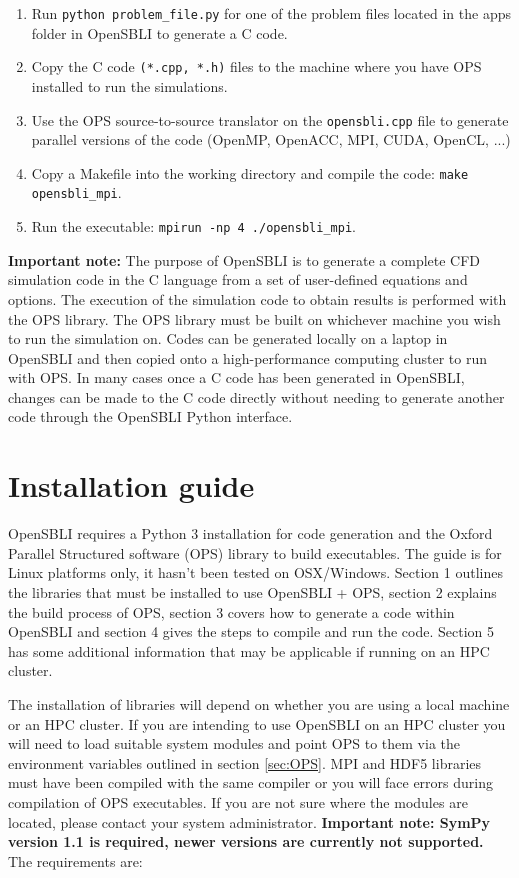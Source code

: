 \documentclass[11pt]{article}
\begin{document}
\begin{enumerate}
\item{Run \verb|python problem_file.py| for one of the problem files located in the apps folder in OpenSBLI to generate a C code.}
\item{Copy the C code \verb|(*.cpp, *.h)| files to the machine where you have OPS installed to run the simulations.}
\item{Use the OPS source-to-source translator on the \verb|opensbli.cpp| file to generate parallel versions of the code (OpenMP, OpenACC, MPI, CUDA, OpenCL, ...)}
\item{Copy a Makefile into the working directory and compile the code: \verb|make opensbli_mpi|.}
\item{Run the executable: \verb|mpirun -np 4 ./opensbli_mpi|.}
\end{enumerate}

\noindent\textbf{Important note:} The purpose of OpenSBLI is to generate a complete CFD simulation code in the C language from a set of user-defined equations and options. The execution of the simulation code to obtain results is performed with the OPS library. The OPS library must be built on whichever machine you wish to run the simulation on. Codes can be generated locally on a laptop in OpenSBLI and then copied onto a high-performance computing cluster to run with OPS. In many cases once a C code has been generated in OpenSBLI, changes can be made to the C code directly without needing to generate another code through the OpenSBLI Python interface.

\newpage
\tableofcontents

\newpage
\section{Installation guide}\label{sec:installation_guide}
OpenSBLI requires a Python 3 installation for code generation and the Oxford Parallel Structured software (OPS) library to build executables. The guide is for Linux platforms only, it hasn't been tested on OSX/Windows. Section 1 outlines the libraries that must be installed to use OpenSBLI + OPS, section 2 explains the build process of OPS, section 3 covers how to generate a code within OpenSBLI and section 4 gives the steps to compile and run the code. Section 5 has some additional information that may be applicable if running on an HPC cluster.


The installation of libraries will depend on whether you are using a local machine or an HPC cluster. If you are intending to use OpenSBLI on an HPC cluster you will need to load suitable system modules and point OPS to them via the environment variables outlined in section \ref{sec:OPS}. MPI and HDF5 libraries must have been compiled with the same compiler or you will face errors during compilation of OPS executables. If you are not sure where the  modules are located, please contact your system administrator. \textbf{Important note: SymPy version 1.1 is required, newer versions are currently not supported.} The requirements are:
\end{document}
